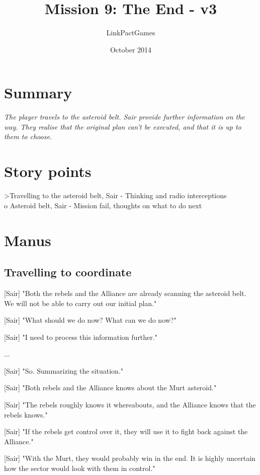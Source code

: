 \documentclass[a4paper,12pt]{article}
\begin{document}
\title{Mission 9: The End - v3}
\author{LinkPactGames}
\date{October 2014}
\maketitle

\section{Summary}

\textit{The player travels to the asteroid belt. Sair provide further information on the way.
They realise that the original plan can't be executed, and that it is up to them to choose.}

\section{Story points}

\textgreater Travelling to the asteroid belt, Sair - Thinking and radio interceptions\\
o Asteroid belt, Sair - Mission fail, thoughts on what to do next

\section{Manus}

\subsection{Travelling to coordinate}

[Sair] "Both the rebels and the Alliance are already scanning the asteroid belt. We will not be
able to carry out our initial plan."

[Sair] "What should we do now? What can we do now?" 

[Sair] "I need to process this information further."

...

[Sair] "So. Summarizing the situation."

[Sair] "Both rebels and the Alliance knows about the Murt asteroid."

[Sair] "The rebels roughly knows it whereabouts, and the Alliance knows that the rebels knows."

[Sair] "If the rebels get control over it, they will use it to fight back against the Alliance."

[Sair] "With the Murt, they would probably win in the end. It is highly uncertain how the sector would look with them in control."
\end{document}
